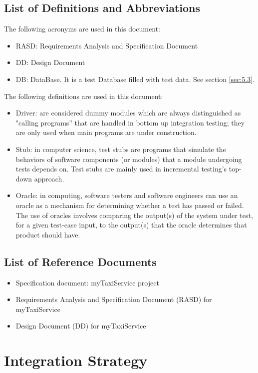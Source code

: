 \documentclass[a4paper,11pt]{report} %
\begin{document}
	\subsection{List of Definitions and Abbreviations}
		The following acronyms are used in this document:
		\begin{itemize}
			\item RASD: Requirements Analysis and Specification Document
			\item DD: Design Document
			\item DB: DataBase. It is a test Database filled with test data. See section \ref{sec:5.3}.
		\end{itemize}
		The following definitions are used in this document:
			\begin{itemize}
				\item Driver: are considered dummy modules which are always distinguished as "calling programs” that are handled in bottom up integration testing; they are only used when main programs are under construction.
				\item Stub: in computer science, test stubs are programs that simulate the behaviors of software components (or modules) that a module undergoing tests depends on. Test stubs are mainly used in incremental testing's top-down approach.
				\item Oracle: in computing, software testers and software engineers can use an oracle as a mechanism for determining whether a test has passed or failed. The use of oracles involves comparing the output(s) of the system under test, for a given test-case input, to the output(s) that the oracle determines that product should have.
			\end{itemize}
	\subsection{List of Reference Documents}
		\begin{itemize}
			\item Specification document: myTaxiService project
			\item Requirements Analysis and Specification Document (RASD) for myTaxiService
			\item Design Document (DD) for myTaxiService
		\end{itemize}
	
	
	\section{Integration Strategy}
\end{document}
